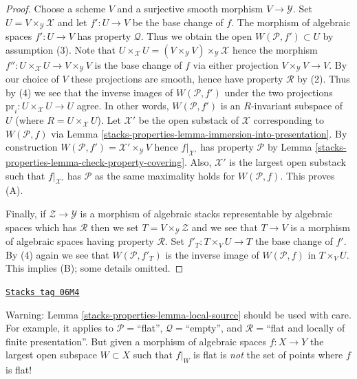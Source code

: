 \begin{proof}
Choose a scheme $V$ and a surjective smooth morphism $V \to \mathcal{Y}$.
Set $U = V \times_\mathcal{Y} \mathcal{X}$ and let $f' : U \to V$ be the
base change of $f$. The morphism of algebraic spaces $f' : U \to V$ has
property $\mathcal{Q}$. Thus we obtain the open $W(\mathcal{P}, f') \subset U$
by assumption (3). Note that
$U \times_\mathcal{X} U =
(V \times_\mathcal{Y} V) \times_\mathcal{Y} \mathcal{X}$
hence the morphism $f'' : U \times_\mathcal{X} U \to V \times_\mathcal{Y} V$
is the base change of $f$ via either projection
$V \times_\mathcal{Y} V \to V$. By our choice of $V$ these projections
are smooth, hence have property $\mathcal{R}$ by (2). Thus by (4) we see
that the inverse images of $W(\mathcal{P}, f')$ under the two projections
$\text{pr}_i : U \times_\mathcal{X} U \to U$ agree. In other words,
$W(\mathcal{P}, f')$ is an $R$-invariant subspace of $U$ (where
$R = U \times_\mathcal{X} U$). Let $\mathcal{X}'$ be the open substack of
$\mathcal{X}$ corresponding to $W(\mathcal{P}, f)$ via
Lemma \ref{stacks-properties-lemma-immersion-into-presentation}.
By construction $W(\mathcal{P}, f') = \mathcal{X}' \times_\mathcal{Y} V$
hence $f|_{\mathcal{X}'}$ has property $\mathcal{P}$ by
Lemma \ref{stacks-properties-lemma-check-property-covering}.
Also, $\mathcal{X}'$ is the largest open substack
such that $f|_{\mathcal{X}'}$ has $\mathcal{P}$ as the same maximality holds
for $W(\mathcal{P}, f)$. This proves (A).

\medskip\noindent
Finally, if $\mathcal{Z} \to \mathcal{Y}$ is a
morphism of algebraic stacks representable by algebraic spaces which has
$\mathcal{R}$ then we set $T = V \times_\mathcal{Y} \mathcal{Z}$ and
we see that $T \to V$ is a morphism of algebraic spaces having
property $\mathcal{R}$. Set $f'_T : T \times_V U \to T$ the base change
of $f'$. By (4) again we see that $W(\mathcal{P}, f'_T)$ is the
inverse image of $W(\mathcal{P}, f)$ in $T \times_V U$. This implies
(B); some details omitted.
\end{proof}

\begin{remark}
\label{stacks-properties-remark-local-source-warning}
\href{https://stacks.math.columbia.edu/tag/06M4}{\texttt{Stacks tag 06M4}}

Warning:
Lemma \ref{stacks-properties-lemma-local-source}
should be used with care. For example, it applies to
$\mathcal{P}=$``flat'', $\mathcal{Q}=$``empty'',
and $\mathcal{R}=$``flat and locally of finite presentation''. But given a
morphism of algebraic spaces $f : X \to Y$ the largest open
subspace $W \subset X$ such that $f|_W$ is flat is {\it not} the set of points
where $f$ is flat!
\end{remark}

